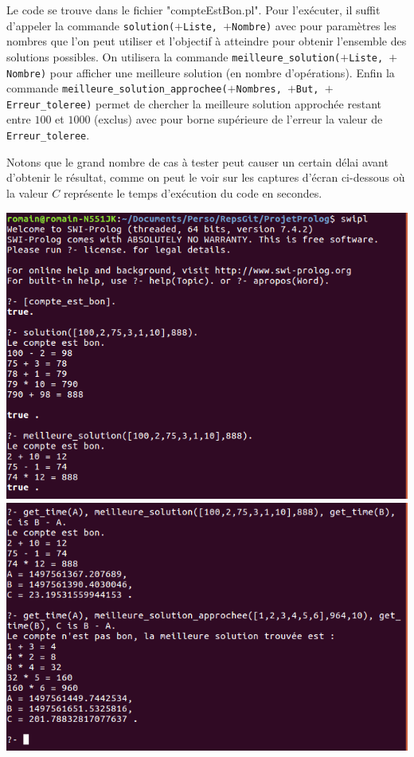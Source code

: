 \documentclass[12pt,a4paper]{article}
\begin{document}
Le code se trouve dans le fichier "compteEstBon.pl". Pour l'exécuter, il suffit d'appeler la commande \texttt{solution($+$Liste, $+$Nombre)} avec pour paramètres les nombres que l'on peut utiliser et l'objectif à atteindre pour obtenir l'ensemble des solutions possibles. On utilisera la commande \texttt{meilleure\_solution($+$Liste, $+$Nombre)} pour afficher une meilleure solution (en nombre d'opérations). Enfin la commande \texttt{meilleure\_solution\_approchee($+$Nombres, $+$But, $+$Erreur\_toleree)} permet de chercher la meilleure solution approchée restant entre $100$ et $1000$ (exclus) avec pour borne supérieure de l'erreur la valeur de \texttt{Erreur\_toleree}.

Notons que le grand nombre de cas à tester peut causer un certain délai avant d'obtenir le résultat, comme on peut le voir sur les captures d'écran ci-dessous où la valeur $C$ représente le temps d'exécution du code en secondes. 

\begin{center}
\includegraphics[width = 400pt]{SolutionCompteEstBon1.png}
\includegraphics[width = 400pt]{SolutionCompteEstBon2.png}
\end{center}
\end{document}
